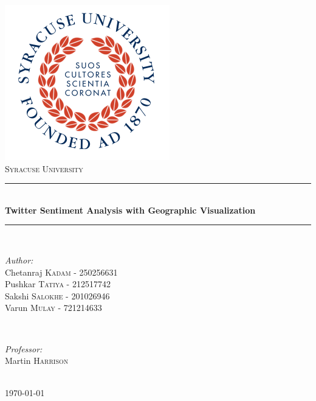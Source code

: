 \documentclass[12pt]{article}
\begin{document}
\begin{titlepage}

\newcommand{\HRule}{\rule{\linewidth}{0.5mm}} 

\center
 

\includegraphics{university_logo1.jpg} \\ [1cm]
\textsc{\LARGE Syracuse University}\\[1cm] 


\HRule \\[0.8cm]
{ \huge \bfseries Twitter Sentiment Analysis with Geographic Visualization}\\[0.4cm] 
\HRule \\[1.4cm]
 

\begin{minipage}{0.5\textwidth}
\begin{flushleft}
\emph{Author:}\\
Chetanraj \textsc{Kadam} - 250256631 \\
Pushkar \textsc{Tatiya} - 212517742 \\
Sakshi \textsc{Salokhe} - 201026946\\
Varun \textsc{Mulay} - 721214633 
\end{flushleft}
\end{minipage}
~
\begin{minipage}{0.4\textwidth}
\begin{flushright} \large
\emph{Professor:} \\
Martin \textsc{Harrison} 
\end{flushright}
\end{minipage}\\[1cm]
{\today}\\[0.8cm]

\vfill 

\end{titlepage}
\tableofcontents
\newpage
\end{document}
